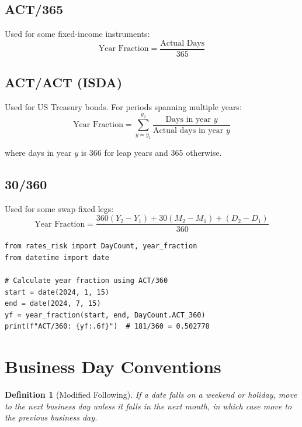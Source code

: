 \documentclass[12pt,a4paper]{report}
\newtheorem{definition}{Definition}[chapter]
\begin{document}
\subsection{ACT/365}

Used for some fixed-income instruments:
\begin{equation}
    \text{Year Fraction} = \frac{\text{Actual Days}}{365}
\end{equation}

\subsection{ACT/ACT (ISDA)}

Used for US Treasury bonds. For periods spanning multiple years:
\begin{equation}
    \text{Year Fraction} = \sum_{y=y_1}^{y_2} \frac{\text{Days in year } y}{\text{Actual days in year } y}
\end{equation}

where days in year $y$ is 366 for leap years and 365 otherwise.

\subsection{30/360}

Used for some swap fixed legs:
\begin{equation}
    \text{Year Fraction} = \frac{360(Y_2-Y_1) + 30(M_2-M_1) + (D_2-D_1)}{360}
\end{equation}

\begin{lstlisting}
from rates_risk import DayCount, year_fraction
from datetime import date

# Calculate year fraction using ACT/360
start = date(2024, 1, 15)
end = date(2024, 7, 15)
yf = year_fraction(start, end, DayCount.ACT_360)
print(f"ACT/360: {yf:.6f}")  # 181/360 = 0.502778
\end{lstlisting}

\section{Business Day Conventions}

\begin{definition}[Modified Following]
If a date falls on a weekend or holiday, move to the next business day unless it falls in the next month, in which case move to the previous business day.
\end{definition}
\end{document}
